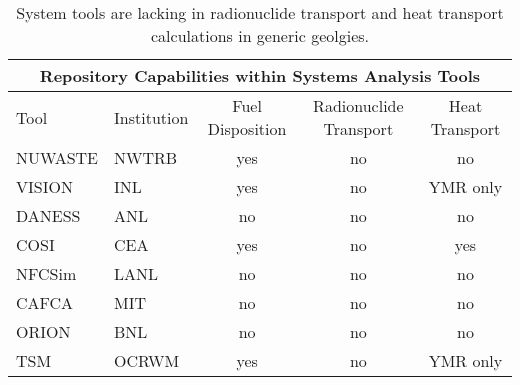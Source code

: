 %
\begin{table}
  \centering
  \footnotesize{
  \begin{tabular}{|l|l|c|c|c|}
    \multicolumn{5}{c}{\textbf{Repository Capabilities within Systems Analysis Tools}}\\
    \hline
    Tool & Institution & Fuel Disposition & Radionuclide Transport & Heat Transport  \\
    \hline
    NUWASTE\cite{abkowitz_nuclear_2010} & NWTRB & yes & no & no \\
    VISION \cite{yacout_vision_2006} & INL   & yes & no & YMR only \\
    DANESS \cite{van_den_durpel_daness:_2006} & ANL   & no & no & no \\
    COSI   \cite{boucher_international_2010} & CEA   & yes & no & yes \\
    NFCSim \cite{schneider_nfcsim_2004} & LANL  & no & no & no \\
    CAFCA  \cite{guerin_benchmark_2009} & MIT   & no & no & no \\
    ORION  \cite{guerin_benchmark_2009} & BNL   & no & no & no \\
    TSM    \cite{turner_discrete_2010} & OCRWM & yes & no & YMR only \\
    \hline
  \end{tabular}
  \caption[System Tools]{System tools are lacking in radionuclide transport and  
  heat transport calculations in generic geolgies.}
  \label{tab:systools}
  }
\end{table}


